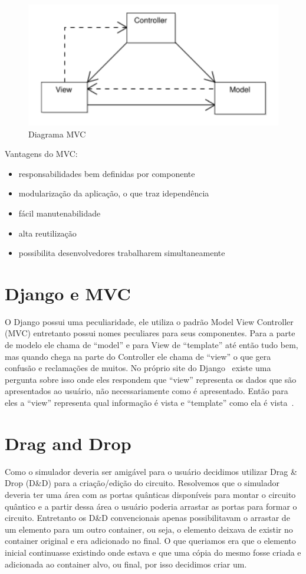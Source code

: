 \documentclass[a4paper, 12pt, oneside]{book}
\begin{document}
\begin{figure}[H]
\centering
\includegraphics[scale=0.4]{mvc.png}
\caption{Diagrama MVC \cite{mvc-murta}}
\end{figure}

Vantagens do MVC:
\begin{itemize}
\item responsabilidades bem definidas por componente
\item modularização da aplicação, o que traz idependência 
\item fácil manutenabilidade
\item alta reutilização
\item possibilita desenvolvedores trabalharem simultaneamente
\end{itemize}

\section{Django e MVC}
O Django possui uma peculiaridade, ele utiliza o padrão Model View Controller (MVC) entretanto possui nomes peculiares para seus componentes. Para a parte de modelo ele chama de ``model'' e para View de ``template'' até então tudo bem, mas quando chega na parte do Controller ele chama de ``view'' o que gera confusão e reclamações de muitos. No próprio site do Django~\cite{django} existe uma pergunta sobre isso onde eles respondem que ``view'' representa os dados que são apresentados ao usuário, não necessariamente como é apresentado. Então para eles a ``view'' representa qual informação é vista e ``template'' como ela é vista~\cite{django-mvc}.

\section{Drag and Drop}

Como o simulador deveria ser amigável para o usuário decidimos utilizar Drag \& Drop (D\&{D}) para a criação/edição do circuito. Resolvemos que o simulador deveria ter uma área com as portas quânticas disponíveis para montar o circuito quântico e a partir dessa área o usuário poderia arrastar as portas para formar o circuito. Entretanto os D\&{D} convencionais apenas possibilitavam o arrastar de um elemento para um outro container, ou seja, o elemento deixava de existir no container original e era adicionado no final. O que queriamos era que o elemento inicial continuasse existindo onde estava e que uma cópia do mesmo fosse criada e adicionada ao container alvo, ou final, por isso decidimos criar um.
\end{document}
